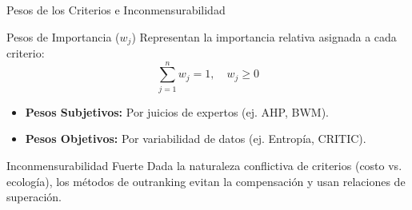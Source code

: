 \documentclass[aspectratio=169, 10pt]{beamer}
\begin{document}
\begin{frame}{Pesos de los Criterios e Inconmensurabilidad}
    \begin{block}{Pesos de Importancia ($w_j$)}
        \small Representan la importancia relativa asignada a cada criterio:
        \begin{equation*}
            \sum_{j=1}^n w_j = 1, \quad w_j \ge 0
        \end{equation*}
        \scriptsize
        \begin{itemize}
            \item \textbf{Pesos Subjetivos:} Por juicios de expertos (ej. AHP, BWM).
            \item \textbf{Pesos Objetivos:} Por variabilidad de datos (ej. Entropía, CRITIC).
        \end{itemize}
    \end{block}
    \begin{alertblock}{Inconmensurabilidad Fuerte}
        \small Dada la naturaleza conflictiva de criterios (costo vs. ecología), los métodos de outranking evitan la compensación y usan relaciones de superación.
    \end{alertblock}
\end{frame}
\end{document}
